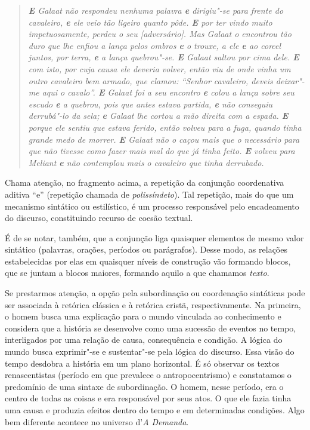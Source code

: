 \documentclass[11pt]{extarticle}
\begin{document}
\begin{quote}
\emph{\textbf{E} Galaat não respondeu nenhuma palavra \textbf{e}
dirigiu"-se para frente do cavaleiro, \textbf{e} ele veio tão ligeiro
quanto pôde. \textbf{E} por ter vindo muito impetuosamente, perdeu o seu
{[}adversário{]}. Mas Galaat o encontrou tão duro que lhe enfiou a lança
pelos ombros \textbf{e} o trouxe, a ele \textbf{e} ao corcel juntos, por
terra, \textbf{e} a lança quebrou"-se. \textbf{E} Galaat saltou por cima
dele. \textbf{E} com isto, por cuja causa ele deveria volver, então viu
de onde vinha um outro cavaleiro bem armado, que clamou: ``Senhor
cavaleiro, deveis deixar"-me aqui o cavalo''. \textbf{E} Galaat foi a seu
encontro \textbf{e} colou a lança sobre seu escudo \textbf{e} a quebrou,
pois que antes estava partida, \textbf{e} não conseguiu derrubá"-lo da
sela; \textbf{e} Galaat lhe cortou a mão direita com a espada.
\textbf{E} porque ele sentiu que estava ferido, então volveu para a
fuga, quando tinha grande medo de morrer. \textbf{E} Galaat não o caçou
mais que o necessário para que não tivesse como fazer mais mal do que já
tinha feito. \textbf{E} volveu para Meliant \textbf{e} não contemplou
mais o cavaleiro que tinha derrubado.}
\end{quote}

Chama atenção, no fragmento acima, a repetição
da conjunção coordenativa aditiva ``e'' (repetição chamada de
\emph{polissíndeto}). Tal repetição, mais do que um mecanismo sintático
ou estilístico, é um processo responsável pelo encadeamento do discurso,
constituindo recurso de coesão textual.

É de se notar, também, que a conjunção liga
quaisquer elementos de mesmo valor sintático (palavras, orações,
períodos ou parágrafos). Desse modo, as relações estabelecidas por elas
em quaisquer níveis de construção vão formando blocos, que se juntam a
blocos maiores, formando aquilo a que chamamos
\emph{texto}.

Se prestarmos atenção, a opção pela
subordinação ou coordenação sintáticas pode ser associada à retórica
clássica e à retórica cristã, respectivamente. Na primeira, o homem
busca uma explicação para o mundo vinculada ao conhecimento e considera
que a história se desenvolve como uma sucessão de eventos no tempo,
interligados por uma relação de causa, consequência e condição. A lógica
do mundo busca exprimir"-se e sustentar"-se pela lógica do discurso. Essa
visão do tempo desdobra a história em um plano horizontal. É só observar
os textos renascentistas (período em que prevalece o antropocentrismo) e
constatamos o predomínio de uma sintaxe de subordinação. O homem, nesse
período, era o centro de todas as coisas e era responsável por seus
atos. O que ele fazia tinha uma causa e produzia efeitos dentro do tempo
e em determinadas condições. Algo bem diferente acontece no universo
d'\emph{A Demanda}.
\end{document}
